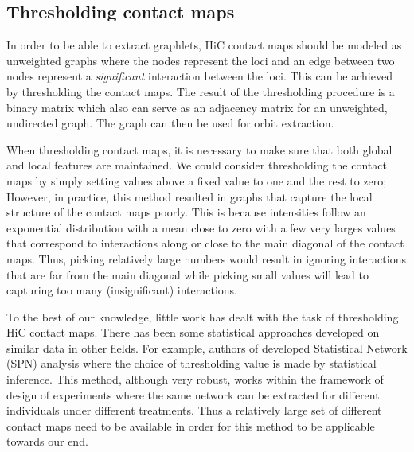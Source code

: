 \documentclass[a4,center,fleqn]{NAR}
\begin{document}
\subsection{Thresholding contact maps}
In order to be able to extract graphlets, HiC contact maps should be modeled as
unweighted graphs where the nodes represent the loci and an edge between two 
nodes represent a \textit{significant} interaction between the loci.
This can be achieved by thresholding the contact maps. The result
of the thresholding procedure is a binary matrix which also can serve as
an adjacency matrix for an unweighted, undirected graph. The graph can then be
used for orbit extraction.

When thresholding contact maps, it is necessary to make sure
that both global and local features are maintained. We could consider 
thresholding the contact maps by simply setting values above a fixed value to
one and the rest to zero; However, in practice, this method resulted in graphs
that capture the local structure of the contact maps poorly. This is because
intensities follow an exponential distribution with a mean close to zero
with a few very larges values that correspond to interactions along 
or close to the main diagonal of the contact maps.
Thus, picking relatively large numbers would result in ignoring interactions
that are far from the main diagonal while picking small values will lead to
capturing too many (insignificant) interactions.

To the best of our knowledge, little work has dealt with the task of
thresholding HiC contact maps. There has been some statistical approaches
developed on similar data in other fields. 
For example, authors of \cite{ginestet2011statistical} developed 
Statistical Network (SPN) analysis
where the choice of thresholding value is made by statistical inference.
This method, although very robust, works within the framework of 
design of experiments where the same
network can be extracted for different 
individuals under different treatments. Thus a relatively large
set of different contact maps need to be available in order for
this method to be applicable towards our end.
\end{document}
